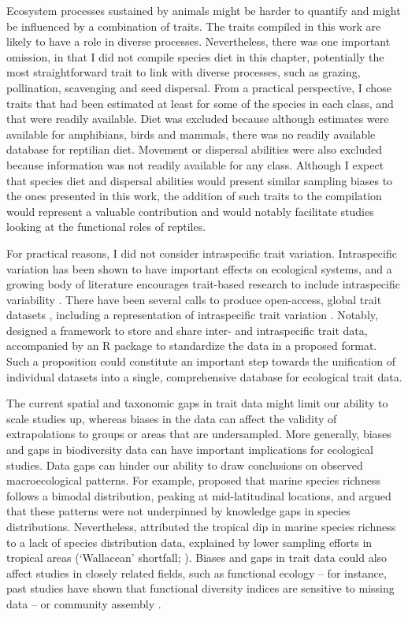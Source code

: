 Ecosystem processes sustained by animals might be harder to quantify and might be influenced by a combination of traits. The traits compiled in this work are likely to have a role in diverse processes. Nevertheless, there was one important omission, in that I did not compile species diet in this chapter, potentially the most straightforward trait to link with diverse processes, such as grazing, pollination, scavenging and seed dispersal. From a practical perspective, I chose traits that had been estimated at least for some of the species in each class, and that were readily available. Diet was excluded because although estimates were available for amphibians, birds and mammals, there was no readily available database for reptilian diet. Movement or dispersal abilities were also excluded because information was not readily available for any class. Although I expect that species diet and dispersal abilities would present similar sampling biases to the ones presented in this work, the addition of such traits to the compilation would represent a valuable contribution and would notably facilitate studies looking at the functional roles of reptiles.

For practical reasons, I did not consider intraspecific trait variation. Intraspecific variation has been shown to have important effects on ecological systems, and a growing body of literature encourages trait-based research to include intraspecific variability \citep{Guralnick2016}. There have been several calls to produce open-access, global trait datasets \citep{Weiss2019}, including a representation of intraspecific trait variation \citep{Kissling2018}. Notably, \citet{Schneider2019} designed a framework to store and share inter- and intraspecific trait data, accompanied by an R package to standardize the data in a proposed format. Such a proposition could constitute an important step towards the unification of individual datasets into a single, comprehensive database for ecological trait data.

The current spatial and taxonomic gaps in trait data might limit our ability to scale studies up, whereas biases in the data can affect the validity of extrapolations to groups or areas that are undersampled. More generally, biases and gaps in biodiversity data can have important implications for ecological studies. Data gaps can hinder our ability to draw conclusions on observed macroecological patterns. For example, \citet{CHAUDHARY2016} proposed that marine species richness follows a bimodal distribution, peaking at mid-latitudinal locations, and argued that these patterns were not underpinned by knowledge gaps in species distributions. Nevertheless, \citet{Menegotto2018} attributed the tropical dip in marine species richness to a lack of species distribution data, explained by lower sampling efforts in tropical areas (`Wallacean' shortfall; \citet{Hortal2015}). Biases and gaps in trait data could also affect studies in closely related fields, such as functional ecology -- for instance, past studies have shown that functional diversity indices are sensitive to missing data \citep{Majekova2016, Pakeman2014} -- or community assembly \citep{Perronne2017}.

